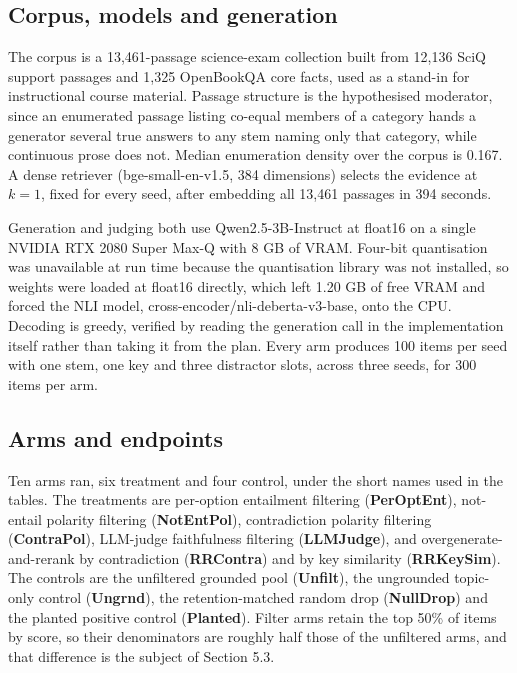 \documentclass[11pt]{article}
\begin{document}
\subsection{Corpus, models and generation}

The corpus is a 13,461-passage science-exam collection built from 12,136 SciQ support passages and 1,325 OpenBookQA core facts, used as a stand-in for instructional course material. Passage structure is the hypothesised moderator, since an enumerated passage listing co-equal members of a category hands a generator several true answers to any stem naming only that category, while continuous prose does not. Median enumeration density over the corpus is 0.167. A dense retriever (bge-small-en-v1.5, 384 dimensions) selects the evidence at $k = 1$, fixed for every seed, after embedding all 13,461 passages in 394 seconds.

Generation and judging both use Qwen2.5-3B-Instruct at float16 on a single NVIDIA RTX 2080 Super Max-Q with 8 GB of VRAM. Four-bit quantisation was unavailable at run time because the quantisation library was not installed, so weights were loaded at float16 directly, which left 1.20 GB of free VRAM and forced the NLI model, cross-encoder/nli-deberta-v3-base, onto the CPU. Decoding is greedy, verified by reading the generation call in the implementation itself rather than taking it from the plan. Every arm produces 100 items per seed with one stem, one key and three distractor slots, across three seeds, for 300 items per arm.

\subsection{Arms and endpoints}

Ten arms ran, six treatment and four control, under the short names used in the tables. The treatments are per-option entailment filtering (\textbf{PerOptEnt}), not-entail polarity filtering (\textbf{NotEntPol}), contradiction polarity filtering (\textbf{ContraPol}), LLM-judge faithfulness filtering (\textbf{LLMJudge}), and overgenerate-and-rerank by contradiction (\textbf{RRContra}) and by key similarity (\textbf{RRKeySim}). The controls are the unfiltered grounded pool (\textbf{Unfilt}), the ungrounded topic-only control (\textbf{Ungrnd}), the retention-matched random drop (\textbf{NullDrop}) and the planted positive control (\textbf{Planted}). Filter arms retain the top 50\% of items by score, so their denominators are roughly half those of the unfiltered arms, and that difference is the subject of Section 5.3.
\end{document}
